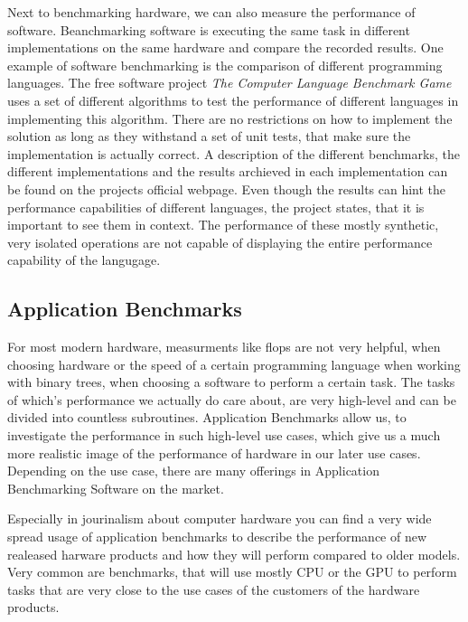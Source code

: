 Next to benchmarking hardware, we can also measure the performance of software. Beanchmarking software is executing the same task in different implementations on the same hardware and compare the recorded results. One example of software benchmarking is the comparison of different programming languages. The free software project \emph{The Computer Language Benchmark Game} uses a set of different algorithms to test the performance of different languages in implementing this algorithm. There are no restrictions on how to implement the solution as long as they withstand a set of unit tests, that make sure the implementation is actually correct. A description of the different benchmarks, the different implementations and the results archieved in each implementation can be found on the projects official webpage.
Even though the results can hint the performance capabilities of different languages, the project states, that it is important to see them in context. The performance of these mostly synthetic, very isolated operations are not capable of displaying the entire performance capability of the langugage.
\cite{CompLangBenchmGame}





\subsection{Application Benchmarks}

For most modern hardware, measurments like \gls{flops} are not very helpful, when choosing hardware or the speed of a certain programming language when working with binary trees, when choosing a software to perform a certain task. The tasks of which's performance we actually do care about, are very high-level and can be divided into countless subroutines. Application Benchmarks allow us, to investigate the performance in such high-level use cases, which give us a much more realistic image of the performance of hardware in our later use cases. Depending on the use case, there are many offerings in Application Benchmarking Software on the market.

Especially in jourinalism about computer hardware you can find a very wide spread usage of application benchmarks to describe the performance of new realeased harware products and how they will perform compared to older models. Very common are benchmarks, that will use mostly CPU or the GPU to perform tasks that are very close to the use cases of the customers of the hardware products.





